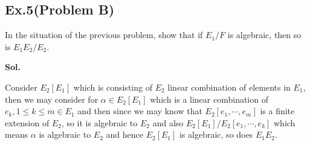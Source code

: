 \documentclass[lang=en,11pt,a4paper,citestyle =authoryear]{elegantpaper}
\begin{document}
\subsection*{Ex.5(Problem B)} 
In the situation of the previous problem, show that if $E_1/F$ is algebraic, then so is $E_1E_2/E_2$.
\vspace{0.5em}\par
\textbf{Sol.} \par
    Consider $E_2[E_1]$ which is consisting of $E_2$ linear combination of elements in $E_1$, then we may consider for $\alpha \in E_2[E_1]$ which is a linear combination of $e_k, 1\leq k \leq m \in E_1$ and then since we may know that $E_2[e_1,\cdots,e_m]$ is a finite extension of $E_2$, so it is algebraic to $E_2$ and also $E_2[E_1]/ E_2[e_1,\cdots,e_k]$ which means $\alpha$ is algebraic to $E_2$ and hence $E_2[E_1]$ is algebraic, so does $E_1E_2$.
\par 
\vspace{0.5em}


\addappheadtotoc
\end{document}
